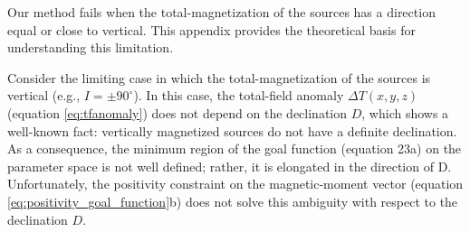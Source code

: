 \label{append:vertical-magnetization}

Our method fails when the total-magnetization of the sources 
has a direction equal or close to vertical. This appendix provides the theoretical basis for 
understanding this limitation.

Consider the limiting case in which the total-magnetization of the sources is vertical 
(e.g., $I = \pm 90^\circ$). In this case, the total-field anomaly $\Delta T(x, y, z)$ 
(equation \ref{eq:tfanomaly}) does not depend on the declination $D$, which shows a 
well-known fact: vertically magnetized sources do not have a definite declination.
As a consequence, the minimum region of the goal function (equation 23a) on the parameter 
space is not well defined; rather, it is  elongated in the direction of D. 
Unfortunately, the positivity constraint on the magnetic-moment
vector (equation \ref{eq:positivity_goal_function}b) does not solve this ambiguity with 
respect to the declination $D$.

